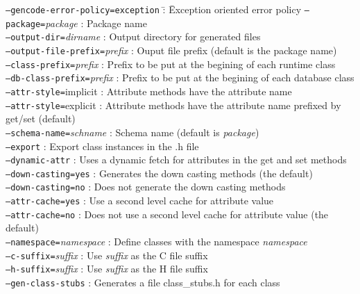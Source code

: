 \begin{tabbing}
\texttt{--gencode-error-policy=exception} \= : \= Exception oriented error policy\kill
\texttt{--package=}\emph{package}          \> : \> Package name\\
\texttt{--output-dir=}\emph{dirname}       \> : \> Output directory for generated files\\
\texttt{--output-file-prefix=}\emph{prefix}\> : \> Ouput file prefix (default is the package name)\\
\texttt{--class-prefix=}\emph{prefix}     \> : \>  Prefix to be put at the begining of each runtime class\\
\texttt{--db-class-prefix=}\emph{prefix}  \> : \>  Prefix to be put at the begining of each database class\\
\texttt{--attr-style=}implicit       \> : \>  Attribute methods have the attribute name\\
\texttt{--attr-style=}explicit       \> : \>  Attribute methods have the attribute name prefixed by get/set (default)\\
\texttt{--schema-name=}\emph{schname}     \> : \>  Schema name (default is \emph{package})\\
\texttt{--export}                    \> : \>  Export class instances in the .h file\\
\texttt{--dynamic-attr}              \> : \>  Uses a dynamic fetch for attributes in the get and set methods\\
\texttt{--down-casting=yes}          \> : \>  Generates the down casting methods (the default)\\
\texttt{--down-casting=no}           \> : \>  Does not generate the down casting methods\\
\texttt{--attr-cache=yes}            \> : \>  Use a second level cache for attribute value\\
\texttt{--attr-cache=no}             \> : \>  Does not use a second level cache for attribute value (the default)\\
\texttt{--namespace=}\emph{namespace}     \> : \>  Define classes with the namespace \emph{namespace}\\
\texttt{--c-suffix=}\emph{suffix}         \> : \>  Use \emph{suffix} as the C file suffix\\
\texttt{--h-suffix=}\emph{suffix}         \> : \>  Use \emph{suffix} as the H file suffix\\
\texttt{--gen-class-stubs}           \> : \>  Generates a file class\_stubs.h for each class\\

\end{tabbing}
